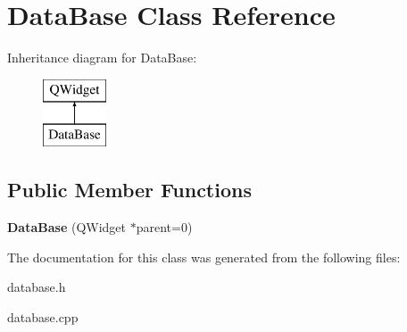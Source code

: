 \hypertarget{class_data_base}{}\section{Data\+Base Class Reference}
\label{class_data_base}
Inheritance diagram for Data\+Base\+:\begin{figure}[H]
\begin{center}
\leavevmode
\includegraphics[height=2.000000cm]{class_data_base}
\end{center}
\end{figure}
\subsection*{Public Member Functions}
\begin{DoxyCompactItemize}
\item 
\hypertarget{class_data_base_a54fde8aa4dfdc9ce978f2985877caf6c}{}\label{class_data_base_a54fde8aa4dfdc9ce978f2985877caf6c} 
{\bfseries Data\+Base} (Q\+Widget $\ast$parent=0)
\end{DoxyCompactItemize}


The documentation for this class was generated from the following files\+:\begin{DoxyCompactItemize}
\item 
database.\+h\item 
database.\+cpp\end{DoxyCompactItemize}
